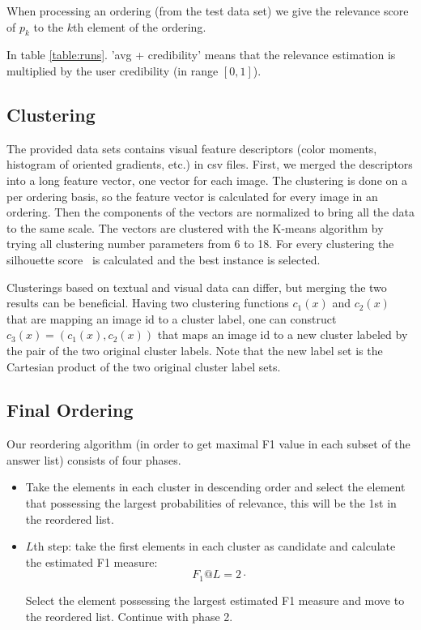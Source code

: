\documentclass{acm_proc_article-me}
\begin{document}
When processing an ordering (from the test data set) we give the relevance score of $p_k$ to the $k$th element of the ordering.

In table \ref{table:runs}. 'avg + credibility' means that the relevance estimation is multiplied by the user credibility (in range $[0,1]$). 

\subsection{Clustering}
\label{sec:clust}

The provided data sets contains visual feature descriptors (color moments, histogram of oriented gradients, etc.) in csv files. First, we merged the descriptors into a long feature vector, one vector for each image. The clustering is done on a per ordering basis, so the feature vector is calculated for every image in an ordering. Then the components of the vectors are normalized to bring all the data to the same scale. The vectors are clustered with the K-means algorithm by trying all clustering number parameters from 6 to 18. For every clustering the silhouette score~\cite{rousseeuw1987silhouettes} is calculated and the best instance is selected.

Clusterings based on textual and visual data can differ, but merging the two results can be beneficial. Having two clustering functions $c_1(x)$ and $c_2(x)$ that are mapping an image id to a cluster label, one can construct $c_3(x) = (c_1(x), c_2(x))$ that maps an image id to a new cluster labeled by the pair of the two original cluster labels. Note that the new label set is the Cartesian product of the two original cluster label sets.

\subsection{Final Ordering}

Our reordering algorithm (in order to get maximal F1 value in each subset of the answer list) consists of four phases.

\begin{itemize}
\item Take the elements in each cluster in descending order and select the element that possessing the largest probabilities of relevance, this will be the 1st in the reordered list.
\item $L$th step: take the first elements in each cluster as candidate and calculate the estimated F1 measure: $$F_1@L = 2 \cdot $$


Select the element possessing the largest estimated F1 measure and move to the reordered list.
Continue with phase 2.
\end{itemize}
\end{document}
